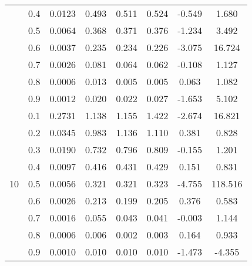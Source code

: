 \documentclass[11pt,a4paper]{report}
\begin{document}
\begin{longtable}{ | c | c || c | c | c | c | c | c | }
 & 0.4 & 0.0123 & 0.493 & 0.511 & 0.524 & -0.549 & 1.680 \\
 & 0.5 & 0.0064 & 0.368 & 0.371 & 0.376 & -1.234 & 3.492 \\
 & 0.6 & 0.0037 & 0.235 & 0.234 & 0.226 & -3.075 & 16.724 \\
 & 0.7 & 0.0026 & 0.081 & 0.064 & 0.062 & -0.108 & 1.127 \\
 & 0.8 & 0.0006 & 0.013 & 0.005 & 0.005 & 0.063 & 1.082 \\
 & 0.9 & 0.0012 & 0.020 & 0.022 & 0.027 & -1.653 & 5.102 \\
 \hline
\multirow{9}{*}{10} & 0.1 & 0.2731 & 1.138 & 1.155 & 1.422 & -2.674 & 16.821 \\
 & 0.2 & 0.0345 & 0.983 & 1.136 & 1.110 & 0.381 & 0.828 \\
 & 0.3 & 0.0190 & 0.732 & 0.796 & 0.809 & -0.155 & 1.201 \\
 & 0.4 & 0.0097 & 0.416 & 0.431 & 0.429 & 0.151 & 0.831 \\
 & 0.5 & 0.0056 & 0.321 & 0.321 & 0.323 & -4.755 & 118.516 \\
 & 0.6 & 0.0026 & 0.213 & 0.199 & 0.205 & 0.376 & 0.583 \\
 & 0.7 & 0.0016 & 0.055 & 0.043 & 0.041 & -0.003 & 1.144 \\
 & 0.8 & 0.0006 & 0.006 & 0.002 & 0.003 & 0.164 & 0.933 \\
 & 0.9 & 0.0010 & 0.010 & 0.010 & 0.010 & -1.473 & -4.355 \\
 \hline
\hline
\end{longtable}
\end{document}
